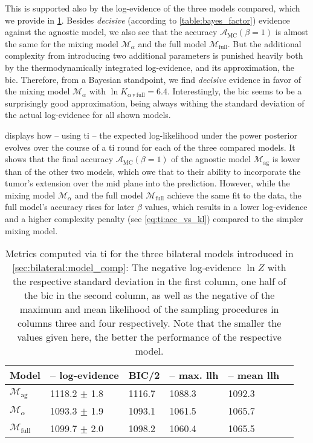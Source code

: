 \documentclass[\relativeRoot/main.tex]{subfiles}
\begin{document}
This is supported also by the log-evidence of the three models compared, which we provide in \cref{table:bilateral:model_comp:evidences}. Besides \emph{decisive} (according to \cref{table:bayes_factor}) evidence against the agnostic model, we also see that the accuracy $\mathcal{A}_\text{MC}(\beta=1)$ is almost the same for the mixing model $\mathcal{M}_\alpha$ and the full model $\mathcal{M}_\text{full}$. But the additional complexity from introducing two additional parameters is punished heavily both by the thermodynamically integrated log-evidence, and its approximation, the \gls{bic}. Therefore, from a Bayesian standpoint, we find \emph{decisive} evidence in favor of the mixing model $\mathcal{M}_\alpha$ with $\ln{K}_{\alpha\,\text{v}\,\text{full}} = 6.4$. Interestingly, the \gls{bic} seems to be a surprisingly good approximation, being always withing the standard deviation of the actual log-evidence for all shown models.

 displays how -- using \gls{ti} -- the expected log-likelihood under the power posterior evolves over the course of a \gls{ti} round for each of the three compared models. It shows that the final accuracy $\mathcal{A}_\text{MC}(\beta=1)$ of the agnostic model $\mathcal{M}_\text{ag}$ is lower than of the other two models, which owe that to their ability to incorporate the tumor's extension over the mid plane into the prediction. However, while the mixing model $\mathcal{M}_\alpha$ and the full model $\mathcal{M}_\text{full}$ achieve the same fit to the data, the full model's accuracy rises for later $\beta$ values, which results in a lower log-evidence and a higher complexity penalty (see \cref{eq:ti:acc_vs_kl}) compared to the simpler mixing model.

\begin{table}
    \centering
    \begin{tabular}{|l|l|l|l|l|l|}
        \hline
        \textbf{Model} & \textbf{-- log-evidence} & \textbf{BIC/2} & \textbf{-- max. llh} & \textbf{-- mean llh} \\
        \hline
        $\mathcal{M}_\text{ag}$ & 1118.2 $\pm$ 1.8 & 1116.7 & 1088.3 & 1092.3 \\
        $\mathcal{M}_\alpha$ & 1093.3 $\pm$ 1.9 & 1093.1 & 1061.5 & 1065.7 \\
        $\mathcal{M}_\text{full}$ & 1099.7 $\pm$ 2.0 & 1098.2 & 1060.4 & 1065.5 \\
        \hline
    \end{tabular}
    \caption[
        Metrics for assessing three bilateral models
    ]{
        Metrics computed via \gls{ti} for the three bilateral models introduced in \cref{sec:bilateral:model_comp}: The negative log-evidence $\ln{Z}$ with the respective standard deviation in the first column, one half of the \gls{bic} in the second column, as well as the negative of the maximum and mean likelihood of the sampling procedures in columns three and four respectively. Note that the smaller the values given here, the better the performance of the respective model.
    }
    \label{table:bilateral:model_comp:evidences}
\end{table}
\end{document}
